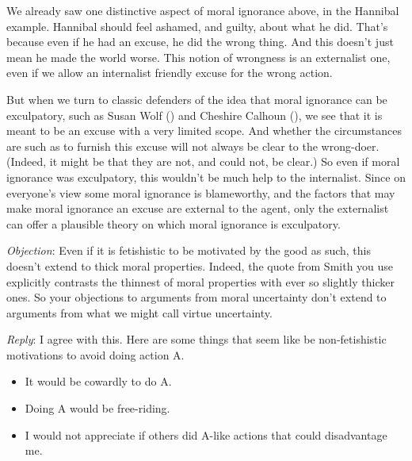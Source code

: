\documentclass[
  10pt,
  letterpaper,
  DIV=11,
  numbers=noendperiod,
  twoside]{scrartcl}
\providecommand{\tightlist}{%
  \setlength{\itemsep}{0pt}\setlength{\parskip}{0pt}}\usepackage{longtable,booktabs,array}
\begin{document}
We already saw one distinctive aspect of moral ignorance above, in the
Hannibal example. Hannibal should feel ashamed, and guilty, about what
he did. That's because even if he had an excuse, he did the wrong thing.
And this doesn't just mean he made the world worse. This notion of
wrongness is an externalist one, even if we allow an internalist
friendly excuse for the wrong action.

But when we turn to classic defenders of the idea that moral ignorance
can be exculpatory, such as Susan Wolf ()
and Cheshire Calhoun (), we see that it
is meant to be an excuse with a very limited scope. And whether the
circumstances are such as to furnish this excuse will not always be
clear to the wrong-doer. (Indeed, it might be that they are not, and
could not, be clear.) So even if moral ignorance was exculpatory, this
wouldn't be much help to the internalist. Since on everyone's view some
moral ignorance is blameworthy, and the factors that may make moral
ignorance an excuse are external to the agent, only the externalist can
offer a plausible theory on which moral ignorance is exculpatory.

\emph{Objection}: Even if it is fetishistic to be motivated by the good
as such, this doesn't extend to thick moral properties. Indeed, the
quote from Smith you use explicitly contrasts the thinnest of moral
properties with ever so slightly thicker ones. So your objections to
arguments from moral uncertainty don't extend to arguments from what we
might call virtue uncertainty.

\emph{Reply}: I agree with this. Here are some things that seem like be
non-fetishistic motivations to avoid doing action A.

\begin{itemize}
\tightlist
\item
  It would be cowardly to do A.
\item
  Doing A would be free-riding.
\item
  I would not appreciate if others did A-like actions that could
  disadvantage me.
\end{itemize}
\end{document}

